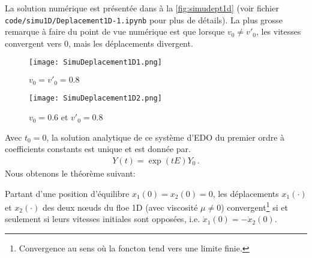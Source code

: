 La solution numérique est présentée dans à la \cref{fig:simudept1d} (voir fichier \verb|code/simu1D/Deplacement1D-1.ipynb| pour plus de détails). La plus grosse remarque à faire du point de vue numérique est que lorsque $v_0 \neq v'_0$, les vitesses convergent vers $0$, mais les déplacements divergent.
\begin{figure*}[!h]
    \centering

    \begin{subfigure}[t]{0.45\textwidth}
        \centering
        \texttt{[image: SimuDeplacement1D1.png]}
        \caption{$v_0=v'_0 = 0.8$}
    \end{subfigure}
    \begin{subfigure}[t]{0.45\textwidth}
        \centering
        \texttt{[image: SimuDeplacement1D2.png]}
        \caption{$v_0= 0.6$ et $v'_0 = 0.8$}
    \end{subfigure}

    \caption{Simulation du déplacement 1D d'un floe avec $m=1$, $k=18$, $\mu=1.3$, $t_{f}=5$. En règle générale, on observe le ralentissement du système et une convergence des déplacements vers l'état d'équilibre $Y_{eq}= (0,0,0,0)$ lorsque $v_0 = v'_0$.}
    \label{fig:simudept1d}
\end{figure*}

Avec $t_0= 0$, la solution analytique de ce système d'EDO du premier ordre à coefficients constants est unique et est donnée par.
\begin{align}
    Y(t) = \exp(tE)Y_0 \,.
\end{align}
Nous obtenons le théorème suivant:
\begin{theorem} \label{th:div1D}
    Partant d'une position d'équilibre $x_1(0) = x_2(0) = 0$, les déplacements $x_1(\cdot)$ et $x_2(\cdot)$ des deux n\oe{}uds du floe 1D (avec viscosité $\mu \neq 0$) convergent\footnote{Convergence au sens où la foncton tend vers une limite finie.} si et seulement si leurs vitesses initiales sont opposées, i.e. $\dot x_1(0) = - \dot x_2(0)$.
\end{theorem}

